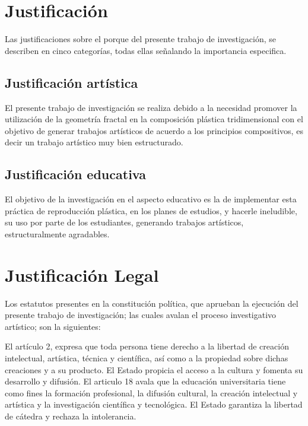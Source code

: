 \documentclass[12pt,]{report}
\begin{document}
\hypertarget{justificaciuxf3n}{%
\section{Justificación}\label{justificaciuxf3n}}

Las justificaciones sobre el porque del presente trabajo de investigación, se describen
en cinco categorías, todas ellas señalando la importancia especifica.

\hypertarget{justificaciuxf3n-artuxedstica}{%
\subsection{Justificación artística}\label{justificaciuxf3n-artuxedstica}}

El presente trabajo de investigación se realiza debido a la necesidad promover la utilización
de la geometría fractal en la composición plástica tridimensional con el objetivo
de generar trabajos artísticos de acuerdo a los principios compositivos, es decir un trabajo
artístico muy bien estructurado.

\hypertarget{justificaciuxf3n-educativa}{%
\subsection{Justificación educativa}\label{justificaciuxf3n-educativa}}

El objetivo de la investigación en el aspecto educativo es la de implementar esta práctica
de reproducción plástica, en los planes de estudios, y hacerle ineludible, su uso por
parte de los estudiantes, generando trabajos artísticos, estructuralmente agradables.

\hypertarget{justificaciuxf3n-legal}{%
\section{Justificación Legal}\label{justificaciuxf3n-legal}}

Los estatutos presentes en la constitución política, que aprueban la ejecución del presente
trabajo de investigación; las cuales avalan el proceso investigativo artístico; son la
siguientes:

El artículo 2, expresa que toda persona tiene derecho a la libertad de creación intelectual, artística, técnica y científica, así como a la propiedad sobre dichas creaciones y a
su producto. El Estado propicia el acceso a la cultura y fomenta su desarrollo y difusión.
El articulo 18 avala que la educación universitaria tiene como fines la formación profesional,
la difusión cultural, la creación intelectual y artística y la investigación científica
y tecnológica. El Estado garantiza la libertad de cátedra y rechaza la intolerancia.
\end{document}
